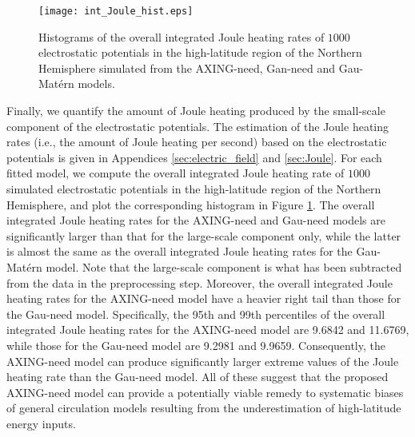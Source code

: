 \documentclass[aoas,preprint]{imsart}
\numberwithin{equation}{section}
\theoremstyle{plain}
\begin{document}
\begin{figure}[htbp] %
   \centering
   \texttt{[image: int\_Joule\_hist.eps]} 
   \caption{Histograms of the overall integrated Joule heating rates of $1000$ electrostatic potentials in the high-latitude region of the Northern Hemisphere simulated from the AXING-need, Gan-need and Gau-Mat\'ern models.}
   \label{fig:energy}
\end{figure}
Finally, we quantify the amount of Joule heating produced by the small-scale component of the electrostatic potentials. The estimation of the Joule heating rates (i.e., the amount of Joule heating per second) based on the electrostatic potentials is given in Appendices \ref{sec:electric_field} and \ref{sec:Joule}.
For each fitted model, we compute the overall integrated Joule heating rate of $1000$ simulated electrostatic potentials in the high-latitude region of the Northern Hemisphere, and plot the corresponding histogram in Figure \ref{fig:energy}. The overall integrated Joule heating rates for the AXING-need and Gau-need models are significantly larger than that for the large-scale component only, while the latter is almost the same as the overall integrated Joule heating rates for the Gau-Mat\'ern model. Note that the large-scale component is what has been subtracted from the data in the preprocessing step. Moreover, the overall integrated Joule heating rates for the AXING-need model have a heavier right tail than those for the Gau-need model. Specifically, the 95th and 99th percentiles of the overall integrated Joule heating rates for the AXING-need model are 9.6842 and 11.6769, while those for the Gau-need model are 9.2981 and 9.9659. Consequently, the AXING-need model can produce significantly larger extreme values of the Joule heating rate than the Gau-need model. All of these suggest that the proposed AXING-need model can provide a potentially viable remedy to systematic biases of general circulation models resulting from the underestimation of high-latitude energy inputs.
\end{document}
